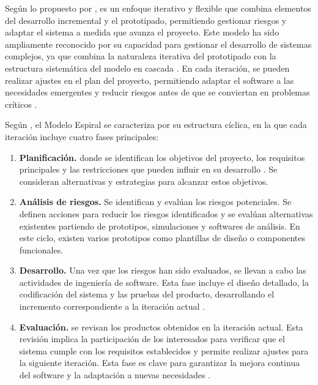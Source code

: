 Según lo propuesto por \citeauthor{boehm_spiral_1988} \citeyear{boehm_spiral_1988}, es un enfoque iterativo y flexible que combina elementos del desarrollo incremental y el prototipado, permitiendo gestionar riesgos y adaptar el sistema a medida que avanza el proyecto. Este modelo ha sido ampliamente reconocido por su capacidad para gestionar el desarrollo de sistemas complejos, ya que combina la naturaleza iterativa del prototipado con la estructura sistemática del modelo en cascada \cite[p. 39]{pressman_ingenieria_2010}. En cada iteración, se pueden realizar ajustes en el plan del proyecto, permitiendo adaptar el software a las necesidades emergentes y reducir riesgos antes de que se conviertan en problemas críticos \cite[p. 40]{pressman_ingenieria_2010}.

Según \citeauthor{boehm_spiral_1988} \citeyear{boehm_spiral_1988}, el Modelo Espiral se caracteriza por su estructura cíclica, en la que cada iteración incluye cuatro fases principales:

\begin{enumerate}
  \item \textbf{Planificación.} donde se identifican los objetivos del proyecto, los requisitos principales y las restricciones que pueden influir en su desarrollo \cite{boehm_spiral_1988}. Se consideran alternativas y estrategias para alcanzar estos objetivos.
  \item \textbf{Análisis de riesgos.} Se identifican y evalúan los riesgos potenciales. Se definen acciones para reducir los riesgos identificados y se evalúan alternativas existentes partiendo de prototipos, simulaciones y softwares de análisis. En este ciclo, existen varios prototipos como plantillas de diseño o componentes funcionales.
  \item \textbf{Desarrollo.} Una vez que los riesgos han sido evaluados, se llevan a cabo las actividades de ingeniería de software. Esta fase incluye el diseño detallado, la codificación del sistema y las pruebas del producto, desarrollando el incremento correspondiente a la iteración actual \cite{boehm_spiral_1988}.
  \item \textbf{Evaluación.} se revisan los productos obtenidos en la iteración actual. Esta revisión implica la participación de los interesados para verificar que el sistema cumple con los requisitos establecidos y permite realizar ajustes para la siguiente iteración. Esta fase es clave para garantizar la mejora continua del software y la adaptación a nuevas necesidades \cite{pressman_ingenieria_2010}.
\end{enumerate}

